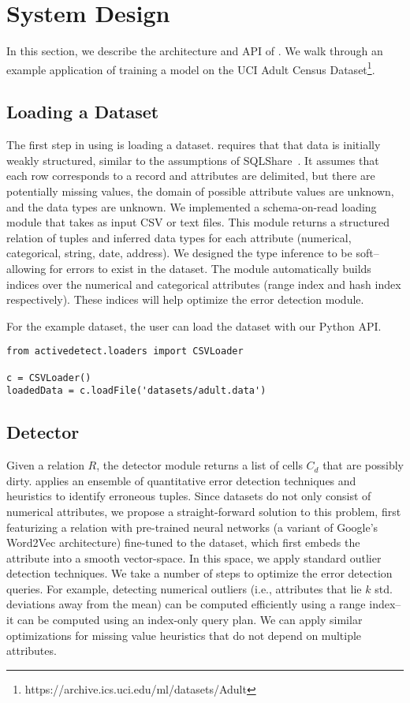 \section{System Design}
In this section, we describe the architecture and API of \sys. We walk through an example application of training a model on the UCI Adult Census Dataset\footnote{https://archive.ics.uci.edu/ml/datasets/Adult}.

\subsection{Loading a Dataset}
The first step in using \sys is loading a dataset. \sys requires that that data is initially weakly structured, similar to the assumptions of SQLShare~\cite{howe2013sqlshare}. It assumes that each row corresponds to a record and attributes are delimited, but there are potentially missing values, the domain of possible attribute values are unknown, and the data types are unknown.
We implemented a schema-on-read loading module that takes as input CSV or text files.
This module returns a structured relation of tuples and inferred data types for each attribute (numerical, categorical, string, date, address).
We designed the type inference to be soft--allowing for errors to exist in the dataset.
The module automatically builds indices over the numerical and categorical attributes (range index and hash index respectively).
These indices will help optimize the error detection module.

For the example dataset, the user can load the dataset with our Python API.
\begin{lstlisting}
from activedetect.loaders import CSVLoader

c = CSVLoader()
loadedData = c.loadFile('datasets/adult.data')
\end{lstlisting}

\subsection{Detector}
Given a relation $R$, the detector module returns a list of cells $C_{d}$ that are possibly dirty.
\sys applies an ensemble of quantitative error detection techniques and heuristics to identify erroneous tuples.
Since datasets do not only consist of numerical attributes, we propose a straight-forward solution to this problem, first featurizing a relation with pre-trained neural networks (a variant of Google's Word2Vec architecture) fine-tuned to the dataset, which first embeds the attribute into a smooth vector-space.
In this space, we apply standard outlier detection techniques.
We take a number of steps to optimize the error detection queries.
For example, detecting numerical outliers (i.e., attributes that lie $k$ std. deviations away from the mean) can be computed efficiently using a range index--it can be computed using an index-only query plan.
We can apply similar optimizations for missing value heuristics that do not depend on multiple attributes.

